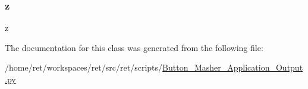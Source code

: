 \subsubsection{\texorpdfstring{z}{z}}
{\footnotesize\ttfamily z}



The documentation for this class was generated from the following file\+:\begin{DoxyCompactItemize}
\item 
/home/ret/workspaces/ret/src/ret/scripts/\hyperlink{Button__Masher__Application__Output_8py}{Button\+\_\+\+Masher\+\_\+\+Application\+\_\+\+Output.\+py}\end{DoxyCompactItemize}
